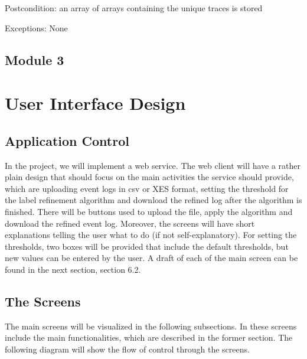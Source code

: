 \documentclass[notitlepage]{article}
\begin{document}
\begin{flushleft}
Postcondition: an array of arrays containing the unique traces is stored

Exceptions: None

\par
\endgroup

\subsection{Module 3}

\section{User Interface Design}
\subsection{Application Control}

In the project, we will implement a web service. The web client will have a rather plain design that should focus on the main activities the service should provide, which are uploading event logs in csv or XES format, setting the threshold for the label refinement algorithm and download the refined log after the algorithm is finished. There will be buttons used to upload the file, apply the algorithm and download the refined event log. Moreover, the screens will have short explanations telling the user what to do (if not self-explanatory). For setting the thresholds, two boxes will be provided that include the default thresholds, but new values can be entered by the user. A draft of each of the main screen can be found in the next section, section 6.2.

\subsection{The Screens}

The main screens will be visualized in the following subsections. In these screens include the main functionalities, which are described in the former section. The following diagram will show the flow of control through the screens.  


\end{flushleft}
\end{document}
